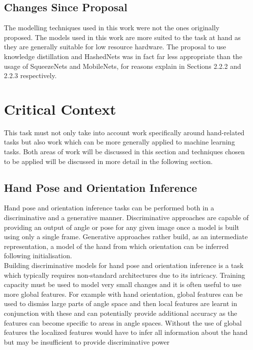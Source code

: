 \documentclass{article}
\begin{document}
\subsection{Changes Since Proposal}
The modelling techniques used in this work were not the ones originally proposed. The models used in this work are more suited to the task at hand as they are generally suitable for low resource hardware. The proposal to use knowledge distillation and HashedNets was in fact far less appropriate than the usage of SqueezeNets and MobileNets, for reasons explain in Sections 2.2.2 and 2.2.3 respectively.

\section{Critical Context}
This task must not only take into account work specifically around hand-related tasks but also work which can be more generally applied to machine learning tasks. Both areas of work will be discussed in this section and techniques chosen to be applied will be discussed in more detail in the following section.   

\subsection{Hand Pose and Orientation Inference}
Hand pose and orientation inference tasks can be performed both in a discriminative and a generative manner. Discriminative approaches are capable of providing an output of angle or pose for any given image once a model is built using only a single frame. Generative approaches rather build, as an intermediate representation, a model of the hand from which orientation can be inferred following initialisation.\\

Building discriminative models for hand pose and orientation inference is a task which typically requires non-standard architectures due to its intricacy. Training capacity must be used to model very small changes and it is often useful to use more global features. For example with hand orientation, global features can be used to dismiss large parts of angle space and then local features are learnt in conjunction with these and can potentially provide additional accuracy as the features can become specific to areas in angle spaces. Without the use of global features the localized features would have to infer all information about the hand but may be insufficient to provide discriminative power\\
\end{document}
